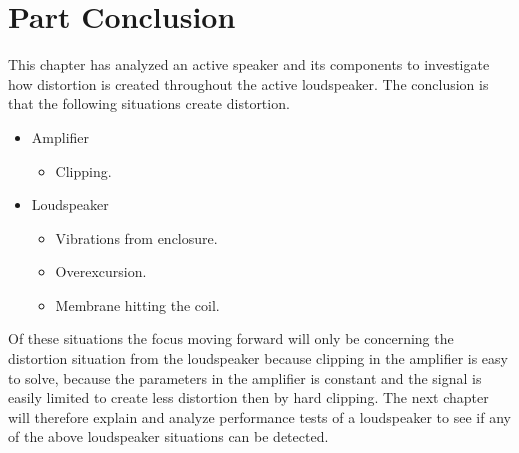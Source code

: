 \section{Part Conclusion}
This chapter has analyzed an active speaker and its components to investigate how distortion is created throughout the active loudspeaker. The conclusion is that the following situations create distortion.
\begin{itemize}
\item Amplifier
	\begin{itemize}
	\item Clipping.
	\end{itemize}
\item Loudspeaker
	\begin{itemize}
	\item Vibrations from enclosure.
	\item Overexcursion.
	\item Membrane hitting the coil.
	\end{itemize}
\end{itemize}
Of these situations the focus moving forward will only be concerning the distortion situation from the loudspeaker because clipping in the amplifier is easy to solve, because the parameters in the amplifier is constant and the signal is easily limited to create less distortion then by hard clipping. The next chapter will therefore explain and analyze performance tests of a loudspeaker to see if any of the above loudspeaker situations can be detected. 